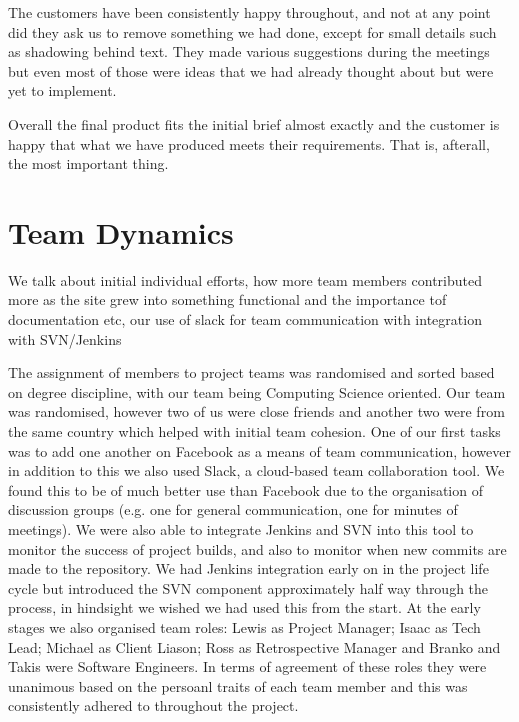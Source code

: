 \documentclass{l3proj}
\begin{document}
The customers have been consistently happy throughout, and not at any point did they ask us to remove something we had done, except for small details such 
as shadowing behind text. They made various suggestions during the meetings but even most of those were ideas that we had already thought about but were 
yet to implement.

Overall the final product fits the initial brief almost exactly and the customer is happy that what we have produced meets their requirements. That
is, afterall, the most important thing.



\section{Team Dynamics}

We talk about initial individual efforts, how more team members contributed more as the site grew into something functional
and the importance tof documentation etc, our use of slack for team communication with integration with SVN/Jenkins

The assignment of members to project teams was randomised and sorted based on degree discipline, with our team being
Computing Science oriented. Our team was randomised, however two of us were close friends and another two were from the
same country which helped with initial team cohesion. One of our first tasks was to add one another on Facebook as a means of
team communication, however in addition to this we also used Slack, a cloud-based team collaboration tool. We found this to
be of much better use than Facebook due to the organisation of discussion groups (e.g. one for general communication, one for
minutes of meetings). We were also able to integrate Jenkins and SVN into this tool to monitor the success of project builds,
and also to monitor when new commits are made to the repository. We had Jenkins integration early on in the project life cycle
but introduced the SVN component approximately half way through the process, in hindsight we wished we had used this from the
start. At the early stages we also organised team roles: Lewis as Project Manager; Isaac as Tech Lead; Michael as Client Liason;
Ross as Retrospective Manager and Branko and Takis were Software Engineers. In terms of agreement of these roles they were unanimous
based on the persoanl traits of each team member and this was consistently adhered to throughout the project.
\end{document}
